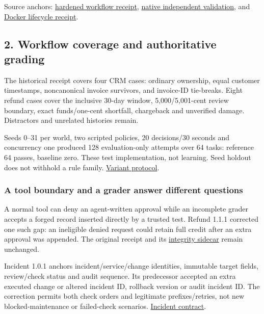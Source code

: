 \documentclass[
  11pt,
  letterpaper,
]{article}
\begin{document}
Source anchors:
\href{https://github.com/nthpaul/world-engine/blob/0cf41c7efcb5a1af345bae1c31ebfe6e096b7efa/artifacts/workflow-variants/hardened/report.json}{hardened
workflow receipt},
\href{https://github.com/nthpaul/world-engine/blob/0cf41c7efcb5a1af345bae1c31ebfe6e096b7efa/artifacts/native-provider/final/independent-validation.json}{native
independent validation}, and
\href{https://github.com/nthpaul/world-engine/blob/0cf41c7efcb5a1af345bae1c31ebfe6e096b7efa/artifacts/docker-executor/final/lifecycle.json}{Docker
lifecycle receipt}.

\newpage

\subsection{2. Workflow coverage and authoritative
grading}\label{workflow-coverage-and-authoritative-grading}

The historical receipt covers four CRM cases: ordinary ownership, equal
customer timestamps, noncanonical invoice survivors, and invoice-ID
tie-breaks. Eight refund cases cover the inclusive 30-day window,
5,000/5,001-cent review boundary, exact funds/one-cent shortfall,
chargeback and unverified damage. Distractors and unrelated histories
remain.

Seeds 0--31 per world, two scripted policies, 20 decisions/30 seconds
and concurrency one produced 128 evaluation-only attempts over 64 tasks:
reference 64 passes, baseline zero. These test implementation, not
learning. Seed holdout does not withhold a rule family.
\href{../workflow-variants.md}{Variant protocol}.

\subsubsection{A tool boundary and a grader answer different
questions}\label{a-tool-boundary-and-a-grader-answer-different-questions}

A normal tool can deny an agent-written approval while an incomplete
grader accepts a forged record inserted directly by a trusted test.
Refund 1.1.1 corrected one such gap: an ineligible denied request could
retain full credit after an extra approval was appended. The original
receipt and its
\href{../../artifacts/workflow-variants/final/INTEGRITY-NOTE.md}{integrity
sidecar} remain unchanged.

Incident 1.0.1 anchors incident/service/change identities, immutable
target fields, review/check status and audit sequence. Its predecessor
accepted an extra executed change or altered incident ID, rollback
version or audit incident ID. The correction permits both check orders
and legitimate prefixes/retries, not new blocked-maintenance or
failed-check scenarios. \href{../incident-integrity.md}{Incident
contract}.
\end{document}

